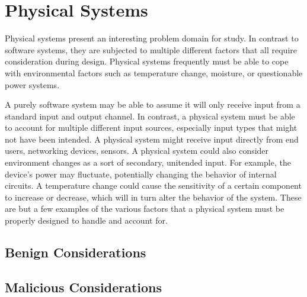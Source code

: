 
\chapter{Physical Systems}
\label{chapter:physicalsystems}

Physical systems present an interesting problem domain for study. In contrast to software systems,
they are subjected to multiple different factors that all require consideration during design. Physical
systems frequently must be able to cope with environmental factors such as temperature change, moisture,
or questionable power systems. 

A purely software system may be able to assume it will only receive input from a standard input and output
channel. In contrast, a physical system must be able
to account for multiple different input sources, especially input types that might not have been intended. 
A physical system might receive input directly from end users, networking devices, sensors. A physical
system could also consider environment changes as a sort of secondary, unitended input. For example,
the device's power may fluctuate, potentially changing the behavior of internal circuits. A temperature change
could cause the sensitivity of a certain component to increase or decrease, which will in turn alter the behavior
of the system. These are but a few examples of the various factors that a physical system must be properly
designed to handle and account for.


\section{Benign Considerations}


\section{Malicious Considerations}

